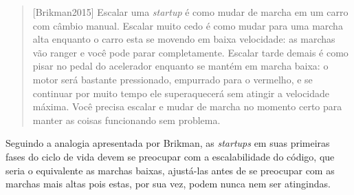 \begin{quotation}[Brikman2015]
    Escalar uma \textit{startup} é como mudar de marcha em um carro com câmbio manual.
    Escalar muito cedo é como mudar para uma marcha alta enquanto o carro esta se movendo
    em baixa velocidade: as marchas vão ranger e você pode parar completamente. Escalar
    tarde demais é como pisar no pedal do acelerador enquanto se mantém em marcha baixa:
    o motor será bastante pressionado, empurrado para o vermelho, e se continuar por muito
    tempo ele superaquecerá sem atingir a velocidade máxima. Você precisa escalar e mudar
    de marcha no momento certo para manter as coisas funcionando sem problema.
\end{quotation}

Seguindo a analogia apresentada por Brikman, as \textit{startups} em suas primeiras fases
do ciclo de vida devem se preocupar com a escalabilidade do código, que seria o equivalente
as marchas baixas, ajustá-las antes de se preocupar com as marchas mais altas pois estas,
por sua vez, podem nunca nem ser atingindas.
